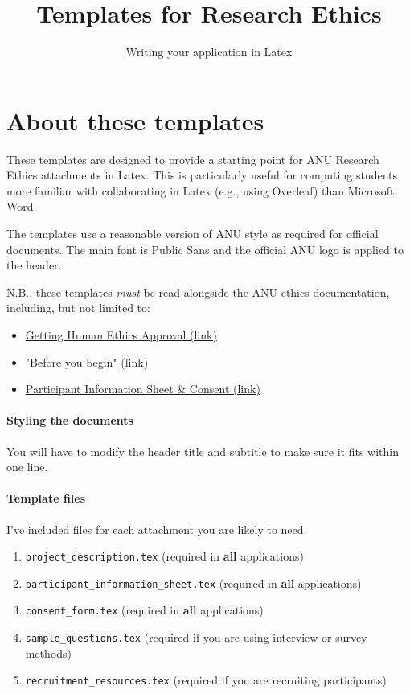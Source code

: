 \documentclass[11pt, a4paper, oneside]{article}
\title{Templates for Research Ethics}
\subtitle{Writing your application in Latex}
\begin{document}
\section{About these templates}

These templates are designed to provide a starting point for ANU Research Ethics attachments in Latex. This is particularly useful for computing students more familiar with collaborating in Latex (e.g., using Overleaf) than Microsoft Word.

The templates use a reasonable version of ANU style as required for official documents. The main font is Public Sans and the official ANU logo is applied to the header.

N.B., these templates \emph{must} be read alongside the ANU ethics documentation, including, but not limited to:

\begin{itemize}
    \item \href{https://services.anu.edu.au/research-support/research-ethics-integrity-compliance/getting-human-research-ethics-approval}{Getting Human Ethics Approval (link)}

    \item \href{https://services.anu.edu.au/research-support/research-ethics-integrity-compliance/getting-human-research-ethics-approval/before-you-begin}{"Before you begin" (link)}

    \item \href{https://services.anu.edu.au/research-support/research-ethics-integrity-compliance/getting-human-research-ethics-approval/participant-information-sheet-consent}{Participant Information Sheet \& Consent (link)}
\end{itemize}

\paragraph{Styling the documents}

You will have to modify the header title and subtitle to make sure it fits within one line.

\paragraph{Template files}

I've included files for each attachment you are likely to need.

\begin{enumerate}
    \item \verb|project_description.tex| (required in \textbf{all} applications)
    \item \verb|participant_information_sheet.tex| (required in \textbf{all} applications)
    \item \verb|consent_form.tex| (required in \textbf{all} applications)
    \item \verb|sample_questions.tex| (required if you are using interview or survey methods)
    \item \verb|recruitment_resources.tex| (required if you are recruiting participants)
\end{enumerate}
\end{document}

